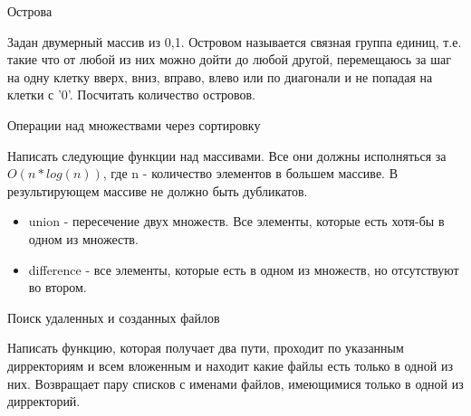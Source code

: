 \documentclass{article}
\begin{document}
\begin{center} Острова \end{center}
Задан двумерный массив из {0,1}. Островом называется связная группа единиц,
т.е. такие что от любой из них можно дойти до любой другой, перемещаюсь за шаг
на одну клетку вверх, вниз, вправо, влево или по диагонали и не попадая на 
клетки с '0'. Посчитать количество островов.
\newpage

\begin{center} Операции над множествами через сортировку \end{center}
Написать следующие функции над массивами. Все они должны исполняться за
$O(n * log(n))$, где n - количество элементов в большем массиве.
В результирующем массиве не должно быть дубликатов.
\begin{itemize}
    \item union - пересечение двух множеств. Все элементы, которые есть 
          хотя-бы в одном из множеств.
    \item difference - все элементы, которые есть в одном из множеств, 
          но отсутствуют во втором.
\end{itemize}
\newpage

\begin{center} Поиск удаленных и созданных файлов \end{center}
Написать функцию, которая получает два пути, проходит по 
указанным дирректориям и всем вложенным и находит какие файлы 
есть только в одной из них. Возвращает пару списков с именами файлов,
имеющимися только в одной из дирректорий.
\newpage
\end{document}
